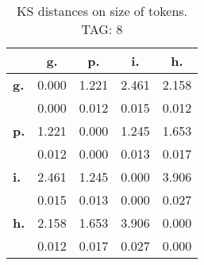 \begin{table}[h!]
\begin{center}
\begin{tabular}{| l || c | c | c | c |}\hline
 & {\bf g.} & {\bf p.} & {\bf i.} & {\bf h.} \\\hline\hline
{\bf g.} & 0.000 & 1.221 & 2.461 & 2.158 \\
{\bf } & 0.000 & 0.012 & 0.015 & 0.012 \\\hline
{\bf p.} & 1.221 & 0.000 & 1.245 & 1.653 \\
{\bf } & 0.012 & 0.000 & 0.013 & 0.017 \\\hline
{\bf i.} & 2.461 & 1.245 & 0.000 & 3.906 \\
{\bf } & 0.015 & 0.013 & 0.000 & 0.027 \\\hline
{\bf h.} & 2.158 & 1.653 & 3.906 & 0.000 \\
{\bf } & 0.012 & 0.017 & 0.027 & 0.000 \\\hline
\end{tabular}
\caption{KS distances on size of tokens. TAG: 8}
\end{center}
\end{table}